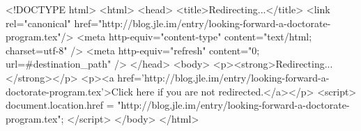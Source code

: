 <!DOCTYPE html>
<html>
<head>
<title>Redirecting...</title>
<link rel="canonical" href="http://blog.jle.im/entry/looking-forward-a-doctorate-program.tex"/>
<meta http-equiv="content-type" content="text/html; charset=utf-8" />
<meta http-equiv="refresh" content="0; url=#{destination_path}" />
</head>
<body>
  <p><strong>Redirecting...</strong></p>
  <p><a href='http://blog.jle.im/entry/looking-forward-a-doctorate-program.tex'>Click here if you are not redirected.</a></p>
  <script>
    document.location.href = "http://blog.jle.im/entry/looking-forward-a-doctorate-program.tex";
  </script>
</body>
</html>
